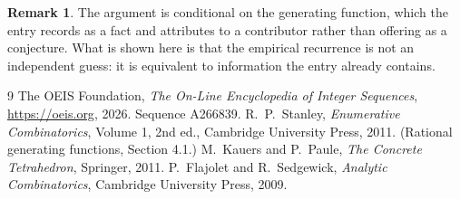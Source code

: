 \documentclass[11pt,a4paper]{article}
\theoremstyle{plain}
\theoremstyle{definition}
\newtheorem{remark}[theorem]{Remark}
\begin{document}
\begin{remark}
The argument is conditional on the generating function, which the entry records as a fact and
attributes to a contributor rather than offering as a conjecture. What is shown here is that
the empirical recurrence is not an independent guess: it is equivalent to information the
entry already contains.
\end{remark}

\begin{thebibliography}{9}
 The OEIS Foundation, \emph{The On-Line Encyclopedia of Integer
Sequences}, \url{https://oeis.org}, 2026. Sequence A266839.
 R.~P.~Stanley, \emph{Enumerative Combinatorics}, Volume 1, 2nd ed.,
Cambridge University Press, 2011. (Rational generating functions, Section 4.1.)
 M.~Kauers and P.~Paule, \emph{The Concrete Tetrahedron}, Springer, 2011.
 P.~Flajolet and R.~Sedgewick, \emph{Analytic Combinatorics}, Cambridge
University Press, 2009.
\end{thebibliography}
\end{document}
